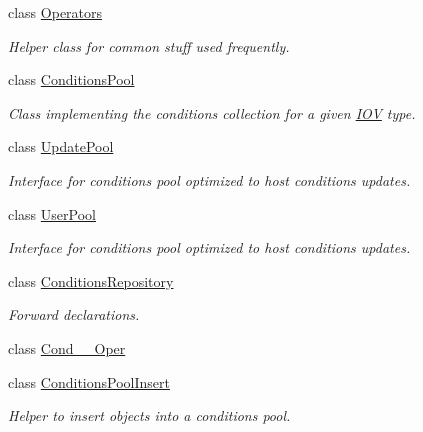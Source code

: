 \begin{DoxyCompactItemize}
class \hyperlink{class_d_d4hep_1_1_conditions_1_1_operators}{Operators}
\begin{DoxyCompactList}\small\item\em Helper class for common stuff used frequently. \item\end{DoxyCompactList}\item 
class \hyperlink{class_d_d4hep_1_1_conditions_1_1_conditions_pool}{ConditionsPool}
\begin{DoxyCompactList}\small\item\em Class implementing the conditions collection for a given \hyperlink{class_d_d4hep_1_1_i_o_v}{IOV} type. \item\end{DoxyCompactList}\item 
class \hyperlink{class_d_d4hep_1_1_conditions_1_1_update_pool}{UpdatePool}
\begin{DoxyCompactList}\small\item\em Interface for conditions pool optimized to host conditions updates. \item\end{DoxyCompactList}\item 
class \hyperlink{class_d_d4hep_1_1_conditions_1_1_user_pool}{UserPool}
\begin{DoxyCompactList}\small\item\em Interface for conditions pool optimized to host conditions updates. \item\end{DoxyCompactList}\item 
class \hyperlink{class_d_d4hep_1_1_conditions_1_1_conditions_repository}{ConditionsRepository}
\begin{DoxyCompactList}\small\item\em Forward declarations. \item\end{DoxyCompactList}\item 
class \hyperlink{class_d_d4hep_1_1_conditions_1_1_cond_____oper}{Cond\_\-\_\-Oper}
\item 
class \hyperlink{class_d_d4hep_1_1_conditions_1_1_conditions_pool_insert}{ConditionsPoolInsert}
\begin{DoxyCompactList}\small\item\em Helper to insert objects into a conditions pool. \item\end{DoxyCompactList}\item 

\end{DoxyCompactItemize}

